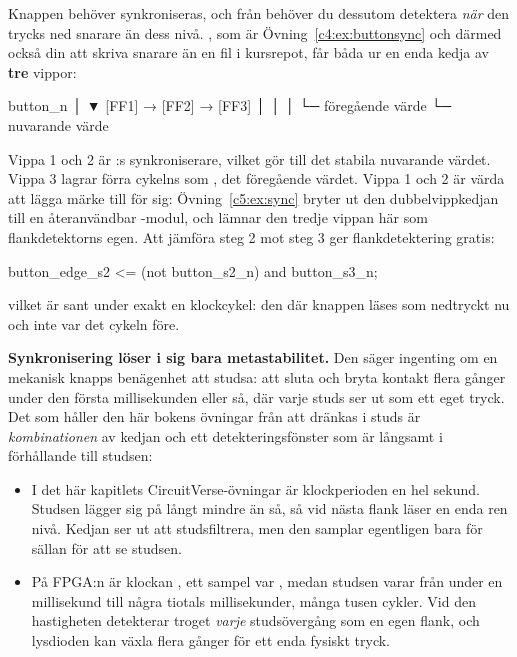 Knappen behöver synkroniseras, och från  behöver du dessutom detektera \emph{när}
den trycks ned snarare än dess nivå. , som är Övning~\ref{c4:ex:buttonsync} och
därmed också din att skriva snarare än en fil i kursrepot, får båda ur en enda kedja av \textbf{tre}
vippor:

\begin{textdrawing}
button_n
   │
   ▼
[FF1] → [FF2] → [FF3]
        │        │
        │        └─ föregående värde
        └─ nuvarande värde
\end{textdrawing}

Vippa 1 och 2 är :s synkroniserare, vilket gör  till det
stabila nuvarande värdet. Vippa 3 lagrar förra cykelns  som ,
det föregående värdet. Vippa 1 och 2 är värda att lägga märke till för sig:
Övning~\ref{c5:ex:sync} bryter ut den dubbelvippkedjan till en återanvändbar -modul, och
lämnar den tredje vippan här som flankdetektorns egen. Att jämföra steg 2 mot steg 3 ger
flankdetektering gratis:

\begin{vhdlcode}
button_edge_s2 <= (not button_s2_n) and button_s3_n;
\end{vhdlcode}

vilket är sant under exakt en klockcykel: den där knappen läses som nedtryckt nu och inte var det
cykeln före.

\textbf{Synkronisering löser i sig bara metastabilitet.} Den säger ingenting om en mekanisk knapps
benägenhet att studsa: att sluta och bryta kontakt flera gånger under den första millisekunden
eller så, där varje studs ser ut som ett eget tryck. Det som håller den här bokens övningar från
att dränkas i studs är \emph{kombinationen} av kedjan och ett detekteringsfönster som är långsamt i
förhållande till studsen:
\begin{itemize}
  \item I det här kapitlets CircuitVerse-övningar är klockperioden en hel sekund. Studsen lägger
    sig på långt mindre än så, så vid nästa flank läser  en enda ren nivå. Kedjan
    ser ut att studsfiltrera, men den samplar egentligen bara för sällan för att se studsen.
  \item På FPGA:n är klockan , ett sampel var , medan studsen varar från
    under en millisekund till några tiotals millisekunder, många tusen cykler. Vid den hastigheten
    detekterar  troget \emph{varje} studsövergång som en egen flank, och
    lysdioden kan växla flera gånger för ett enda fysiskt tryck.
\end{itemize}

